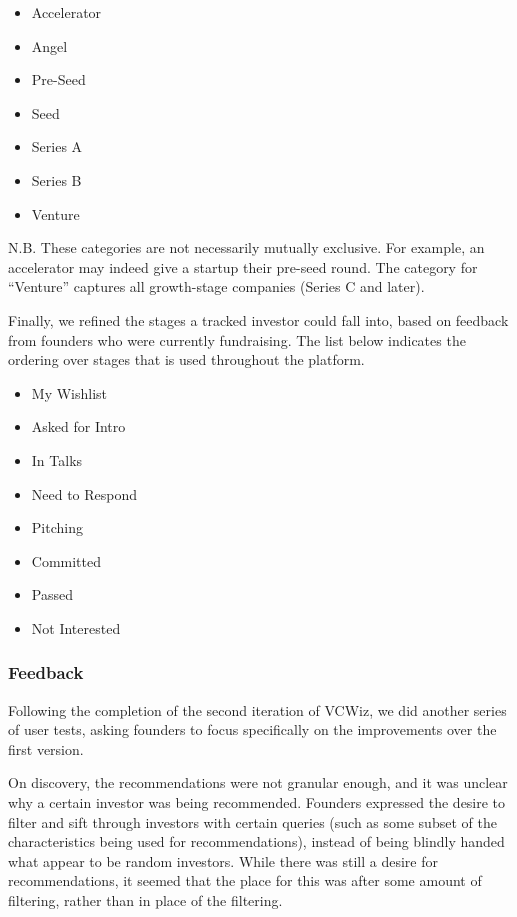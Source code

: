 \begin{multicols}{2}
\begin{itemize}
  \item Accelerator
  \item Angel
  \item Pre-Seed
  \item Seed
  \item Series A
  \item Series B
  \item Venture
\end{itemize}
\end{multicols}

N.B. These categories are not necessarily mutually exclusive. For example, an accelerator may indeed give a startup their pre-seed round. The category for ``Venture'' captures all growth-stage companies (Series C and later).

Finally, we refined the stages a tracked investor could fall into, based on feedback from founders who were currently fundraising. The list below indicates the ordering over stages that is used throughout the platform.

\begin{multicols}{2}
\begin{itemize}
  \item My Wishlist
  \item Asked for Intro
  \item In Talks
  \item Need to Respond
  \item Pitching
  \item Committed
  \item Passed
  \item Not Interested
\end{itemize}
\end{multicols}

\subsubsection{Feedback}

Following the completion of the second iteration of VCWiz, we did another series of user tests, asking founders to focus specifically on the improvements over the first version.

On discovery, the recommendations were not granular enough, and it was unclear why a certain investor was being recommended. Founders expressed the desire to filter and sift through investors with certain queries (such as some subset of the characteristics being used for recommendations), instead of being blindly handed what appear to be random investors. While there was still a desire for recommendations, it seemed that the place for this was after some amount of filtering, rather than in place of the filtering.

